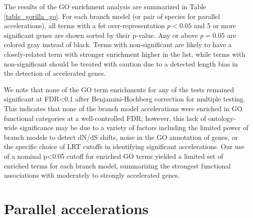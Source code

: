 The results of the GO enrichment analysis are summarized in Table
\ref{table_gorilla_go}. For each branch model (or pair of species for
parallel accelerations), all terms with a \ac{fet} over-representation
$p<0.05$ and 5 or more significant genes are shown sorted by their
\topgo p-value. Any \topgo or \goseq \pvs above $p=0.05$ are colored
gray instead of black. Terms with non-significant \topgo \pvs are
likely to have a closely-related term with stronger enrichment higher
in the list, while terms with non-significant \goseq \pvs should be
treated with caution due to a detected length bias in the detection of
accelerated genes.

We note that none of the GO term enrichments for any of the tests
remained significant at FDR<0.1 after Benjamini-Hochberg correction
for multiple testing. This indicates that none of the branch model
accelerations were enriched in GO functional categories at a
well-controlled FDR; however, this lack of ontology-wide significance
may be due to a variety of factors including the limited power of
branch models to detect dN/dS shifts, noise in the GO annotation of
genes, or the specific choice of LRT cutoffs in identifying
significant accelerations. Our use of a nominal p<0.05 cutoff for
enriched GO terms yielded a limited set of enriched terms for each
branch model, summarizing the strongest functional associations with
moderately to strongly accelerated genes.

\section{Parallel accelerations}
\label{sec_parallel_accel}
